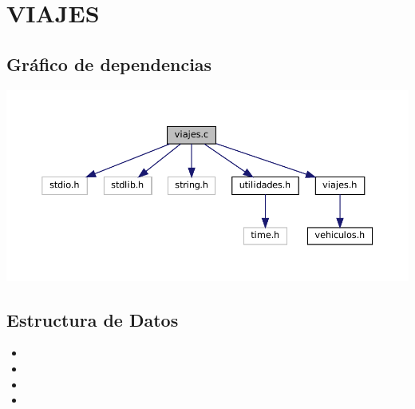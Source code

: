 \section{VIAJES}
\subsection{Gráfico de dependencias}
\includegraphics[width=\textwidth, angle=0, scale=0.6]{dep/viajes_include.pdf}
\subsection{Estructura de Datos}
\begin{itemize}
    \item {}
    \item {}
    \item {}
    \item {}
\end{itemize}
